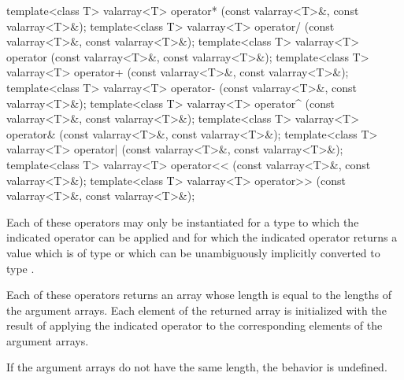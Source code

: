 %
%
%
%
%
%
%
%
%
%
\begin{itemdecl}
template<class T> valarray<T> operator*
    (const valarray<T>&, const valarray<T>&);
template<class T> valarray<T> operator/
    (const valarray<T>&, const valarray<T>&);
template<class T> valarray<T> operator%
    (const valarray<T>&, const valarray<T>&);
template<class T> valarray<T> operator+
    (const valarray<T>&, const valarray<T>&);
template<class T> valarray<T> operator-
    (const valarray<T>&, const valarray<T>&);
template<class T> valarray<T> operator^
    (const valarray<T>&, const valarray<T>&);
template<class T> valarray<T> operator&
    (const valarray<T>&, const valarray<T>&);
template<class T> valarray<T> operator|
    (const valarray<T>&, const valarray<T>&);
template<class T> valarray<T> operator<<
    (const valarray<T>&, const valarray<T>&);
template<class T> valarray<T> operator>>
    (const valarray<T>&, const valarray<T>&);
\end{itemdecl}

\begin{itemdescr}
\pnum
Each of these operators may only be instantiated for a type 
to which the indicated operator can be applied and for which the indicated
operator returns a value which is of type  or which
can be unambiguously implicitly converted to type .

\pnum
Each of these operators returns an array whose length is equal to the
lengths of the argument arrays.
Each element of the returned array is
initialized with the result of applying the indicated operator to the
corresponding elements of the argument arrays.

\pnum
If the argument arrays do not have the same length, the behavior is undefined.%
\end{itemdescr}

